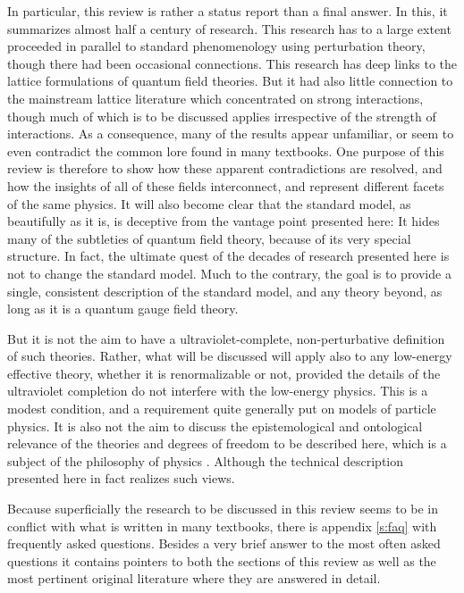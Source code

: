 \documentclass[final,twoside,12pt]{article}
\newcommand*{\1}{1\!\!\!\bot}
\begin{document}
In particular, this review is rather a status report than a final answer. In this, it summarizes almost half a century of research. This research has to a large extent proceeded in parallel to standard phenomenology using perturbation theory, though there had been occasional connections. This research has deep links to the lattice formulations of quantum field theories. But it had also little connection to the mainstream lattice literature which concentrated on strong interactions, though much of which is to be discussed applies irrespective of the strength of interactions. As a consequence, many of the results appear unfamiliar, or seem to even contradict the common lore found in many textbooks. One purpose of this review is therefore to show how these apparent contradictions are resolved, and how the insights of all of these fields interconnect, and represent different facets of the same physics. It will also become clear that the standard model, as beautifully as it is, is deceptive from the vantage point presented here: It hides many of the subtleties of quantum field theory, because of its very special structure. In fact, the ultimate quest of the decades of research presented here is not to change the standard model. Much to the contrary, the goal is to provide a single, consistent description of the standard model, and any theory beyond, as long as it is a quantum gauge field theory. 

But it is not the aim to have a ultraviolet-complete, non-perturbative definition of such theories. Rather, what will be discussed will apply also to any low-energy effective theory, whether it is renormalizable or not, provided the details of the ultraviolet completion do not interfere with the low-energy physics. This is a modest condition, and a requirement quite generally put on models of particle physics. It is also not the aim to discuss the epistemological and ontological relevance of the theories and degrees of freedom  to be described here, which is a subject of the philosophy of physics \cite{Lyre:2008af,Francois:2017aa}. Although the technical description presented here in fact realizes such views.

Because superficially the research to be discussed in this review seems to be in conflict with what is written in many textbooks, there is appendix \ref{s:faq} with frequently asked questions. Besides a very brief answer to the most often asked questions it contains pointers to both the sections of this review as well as the most pertinent original literature where they are answered in detail.
\end{document}

